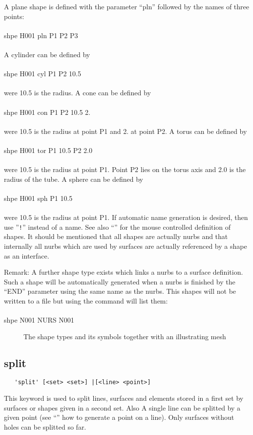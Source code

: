 \documentclass{article}
\begin{document}
A plane shape is defined with the parameter ``pln'' followed by the names of three points:\\\\shpe H001 pln P1 P2 P3\\\\A cylinder can be defined by\\\\shpe H001 cyl P1 P2 10.5\\\\were 10.5 is the radius. A cone can be defined by\\\\shpe H001 con P1 P2 10.5 2.\\\\were 10.5 is the radius at point P1 and 2. at point P2. A torus can be defined by\\\\shpe H001 tor P1 10.5 P2 2.0\\\\were 10.5 is the radius at point P1. Point P2 lies on the torus axis and 2.0 is the radius of the tube. A sphere can be defined by\\\\shpe H001 sph P1 10.5\\\\were 10.5 is the radius at point P1. If automatic name generation is desired, then use ''\verb_!_'' instead of a name. See also ``'' for the mouse controlled definition of shapes. It should be mentioned that all shapes are actually nurbs and that internally all nurbs which are used by surfaces are actually referenced by a shape as an interface.

Remark: A further shape type exists which links a nurbs to a surface definition. Such a shape will be automatically generated when a nurbs is finished by the ``END'' parameter using the same name as the nurbs. This shapes will not be written to a file but using the  command will list them:\\\\shpe N001 NURS N001

\begin{figure}[h]
\caption{\label{The shape types and its symbols together with an illustrating mesh}The shape types and its symbols together with an illustrating mesh}
\end{figure}

\subsection{\label{split}split}
\begin{verbatim}
   'split' [<set> <set>] |[<line> <point>]
\end{verbatim}
This keyword is used to split lines, surfaces and elements stored in a first set by surfaces or shapes given in a second set. Also A single line can be splitted by a given point (see ``'' how to generate a point on a line). Only surfaces without holes can be splitted so far.
\end{document}
